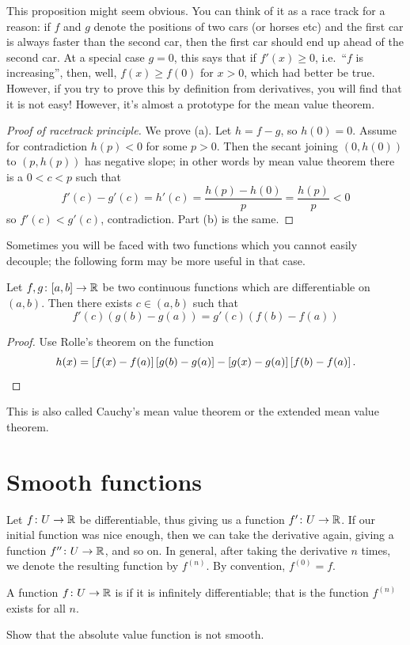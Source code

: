 This proposition might seem obvious.
You can think of it as a race track for a reason:
if $f$ and $g$ denote the positions of two cars (or horses etc)
and the first car is always faster than the second car,
then the first car should end up ahead of the second car.
At a special case $g = 0$, this says that if $f'(x) \ge 0$,
i.e.\ ``$f$ is increasing'',
then, well, $f(x) \ge f(0)$ for $x > 0$, which had better be true.
However, if you try to prove this by definition from derivatives,
you will find that it is not easy!
However, it's almost a prototype for the mean value theorem.

\begin{proof}
	[Proof of racetrack principle]
	We prove (a). Let $h = f-g$, so $h(0) = 0$.
	Assume for contradiction $h(p) < 0$ for some $p > 0$.
	Then the secant joining $(0, h(0))$ to $(p, h(p))$ has negative slope;
	in other words by mean value theorem there is a $0 < c < p$
	such that
	\[ f'(c) - g'(c) = h'(c) = \frac{h(p)-h(0)}{p} = \frac{h(p)}{p} < 0 \]
	so $f'(c) < g'(c)$, contradiction.
	Part (b) is the same.
\end{proof}

Sometimes you will be faced with two functions which you cannot
easily decouple; the following form may be more useful in that case.
\begin{theorem}
	Let $f, g \colon [a,b] \to \mathbb R$ be two continuous functions
	which are differentiable on $(a,b)$.
	Then there exists $c \in (a,b)$ such that
	\[ f'(c)(g(b)-g(a)) = g'(c)(f(b)-f(a)) \]
\end{theorem}
\begin{proof}
	Use Rolle's theorem on the function
	\[ h(x) = \left[ f(x)-f(a) \right] \left[ g(b)-g(a) \right]
		- \left[ g(x)-g(a) \right] \left[ f(b)-f(a) \right].  \qedhere \]
\end{proof}
This is also called Cauchy's mean value theorem
or the extended mean value theorem.

\section{Smooth functions}

Let $f \colon U \to \mathbb R$ be differentiable,
thus giving us a function $f' \colon U \to \mathbb R$.
If our initial function was nice enough,
then we can take the derivative again,
giving a function $f'' \colon U \to \mathbb R$, and so on.
In general, after taking the derivative $n$ times,
we denote the resulting function by $f^{(n)}$.
By convention, $f^{(0)} = f$.
\begin{definition}
	A function $f \colon U \to \mathbb R$ is 
	if it is infinitely differentiable;
	that is the function $f^{(n)}$ exists for all $n$.
\end{definition}
\begin{ques}
	Show that the absolute value function is not smooth.
\end{ques}

